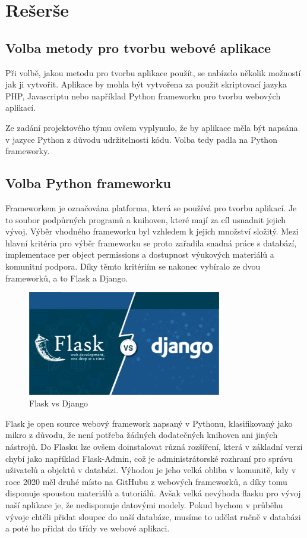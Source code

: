 \chapter{Rešerše}
\label{1-reserse}

\section{Volba metody pro tvorbu webové aplikace}

Při volbě, jakou metodu pro tvorbu aplikace použít, se nabízelo několik 
možností jak ji vytvořit. Aplikace by mohla být vytvořena za použit 
skriptovací jazyka PHP, Javascriptu nebo například Python frameworku 
pro tvorbu webových aplikací. 

Ze zadání projektového týmu ovšem vyplynulo, že by aplikace měla být 
napsána v jazyce Python z důvodu udržitelnosti kódu. Volba tedy padla 
na Python frameworky.

\section{Volba Python frameworku}
Frameworkem je označována platforma, která se používá pro tvorbu aplikací. 
Je to soubor podpůrných programů a knihoven, které mají za cíl usnadnit 
jejich vývoj. Výběr vhodného frameworku byl vzhledem k jejich množství 
složitý. Mezi hlavní kritéria pro výběr frameworku se proto zařadila snadná 
práce s databází, implementace per object permissions a dostupnost 
výukových materiálů a komunitní podpora. Díky těmto kritériím se nakonec 
vybíralo ze dvou frameworků, a to Flask a Django.

\begin{figure}[H] \centering
    \includegraphics[width=240pt]{./pictures/1-django-vs-flask.jpeg}
    \caption[Flask vs Django]{Flask vs Django \cite{django-vs-flask}}
	\label{fig:Flask vs Django}                                
\end{figure}

Flask je open source webový framework napsaný v Pythonu, klasifikovaný
jako mikro z důvodu, že není potřeba žádných dodatečných knihoven ani
jiných nástrojů. Do Flasku lze ovšem doinstalovat různá rozšíření,
která v základní verzi chybí jako například Flask-Admin, což je
administrátorské rozhraní pro správu uživatelů a objektů v
databázi. Výhodou je jeho velká obliba v komunitě, kdy v roce 2020 měl
druhé místo na GitHubu z webových frameworků, a díky tomu disponuje
spoustou materiálů a tutoriálů. Avšak velká nevýhoda flasku pro vývoj
naší aplikace je, že nedisponuje datovými modely. Pokud bychom v průběhu
vývoje chtěli přidat sloupec do naší databáze, musíme to udělat ručně
v databázi a poté ho přidat do třídy ve webové aplikaci. \cite{flask}

